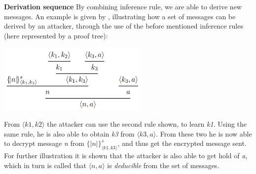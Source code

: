 \noindent \textbf{Derivation sequence}  \qquad
By combining inference rule, we are able to derive new messages. An example is given by \citeauthor{DBLP:journals/ftpl/CortierK14}, illustrating how a set of messages can be derived by an attacker, through the use of the before mentioned inference rules (here represented by a proof tree):
\begin{center}
\includegraphics[width=0.55\textwidth, angle=0]{Graphics/Proof_tree.pdf}
\end{center}
From $\langle k1, k2\rangle$ the attacker can use the second rule shown, to learn \textit{k1}. Using the same rule, he is also able to obtain \textit{k3} from $\langle k3, a\rangle$. From these two he is now able to decrypt message \textit{n} from $\{|n|\}^s_{\langle k1, k3\rangle}$, and thus get the encrypted message sent. For further illustration it is shown that the attacker is also able to get hold of \textit{a}, which in turn is called that $\langle n, a\rangle$ is \textit{deducible} from the set of messages.

 



